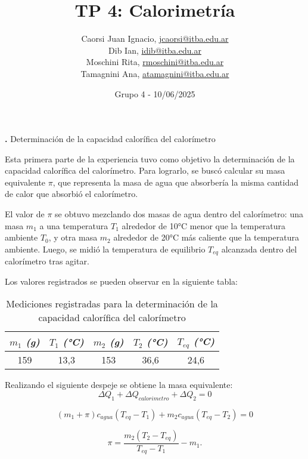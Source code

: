 \documentclass[12pt, a4paper]{article}
\title{TP 4: Calorimetría}
\author
{
  Caorsi Juan Ignacio, \href{jcaorsi@itba.edu.ar}{jcaorsi@itba.edu.ar} \\
  Dib Ian, \href{idib@itba.edu.ar}{idib@itba.edu.ar} \\
  Moschini Rita, \href{rmoschini@itba.edu.ar}{rmoschini@itba.edu.ar} \\
  Tamagnini Ana, \href{atamagnini@itba.edu.ar}{atamagnini@itba.edu.ar}
}
\date{Grupo 4 - 10/06/2025}
\newcounter{step}
\newcommand{\step}[1]
{
  \par\vspace{2ex}
  \stepcounter{step}
  \noindent\textbf{\arabic{step}.} #1\par\vspace{1ex}
}
\begin{document}
\maketitle


\step{Determinación de la capacidad calorífica del calorímetro}

Esta primera parte de la experiencia tuvo como objetivo la determinación de la capacidad calorífica del calorímetro. Para lograrlo, se buscó calcular su masa equivalente $\pi$, que representa la masa de agua que absorbería la misma cantidad de calor que absorbió el calorímetro.

El valor de $\pi$ se obtuvo mezclando dos masas de agua dentro del calorímetro: una masa $m_1$ a una temperatura $T_1$ alrededor de 10°C menor que la temperatura ambiente $T_0$, y otra masa $m_2$ alrededor de 20°C más caliente que la temperatura ambiente. Luego, se midió la temperatura de equilibrio $T_{eq}$ alcanzada dentro del calorímetro tras agitar. 

Los valores registrados se pueden observar en la siguiente tabla:

\begin{table}[h!]
\centering
    \begin{tabular}{|c|c|c|c|c|}
        \hline
            \textit{$m_1$ (g)} & \textit{$T_1$ (°C)} & \textit{$m_2$ (g)} & \textit{$T_2$ (°C)} & \textit{$T_{eq}$ (°C)} \\
        \hline
            159 & 13,3 & 153 & 36,6 & 24,6 \\
        \hline
    \end{tabular}
\caption{Mediciones registradas para la determinación de la capacidad calorífica del calorímetro}
\end{table}

Realizando el siguiente despeje se obtiene la masa equivalente:
\begin{equation}
    \Delta Q_1 + \Delta Q_{calorimetro} + \Delta Q_2 = 0
\end{equation}

\begin{equation}
    (m_1 + \pi) c_{agua} (T_{eq} - T_1) + m_2 c_{agua} (T_{eq} - T_2) = 0
\end{equation}

\begin{equation}
    \pi = \frac{m_2 (T_2 - T_{eq})}{T_{eq} - T_1} - m_1.
\end{equation}
\end{document}
